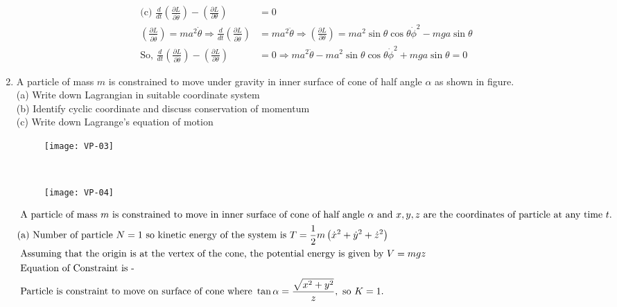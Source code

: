 \begin{enumerate}
\begin{answer}
\begin{align*}
		\text{(c) }\frac{d}{d t}\left(\frac{\partial L}{\partial \dot{\theta}}\right)-\left(\frac{\partial L}{\partial \theta}\right)&=0\\
		\left(\frac{\partial L}{\partial \dot{\theta}}\right)=m a^{2} \dot{\theta} \Rightarrow \frac{d}{d t}\left(\frac{\partial L}{\partial \dot{\theta}}\right)&=m a^{2} \ddot{\theta} \Rightarrow\left(\frac{\partial L}{\partial \theta}\right)=m a^{2} \sin \theta \cos \theta \dot{\phi}^{2}-m g a \sin \theta\\
		\text{So, }\frac{d}{d t}\left(\frac{\partial L}{\partial \dot{\theta}}\right)-\left(\frac{\partial L}{\partial \theta}\right)&=0 \Rightarrow m a^{2} \ddot{\theta}-m a^{2} \sin \theta \cos \theta \dot{\phi}^{2}+m g a \sin \theta=0
		\end{align*}
	\end{answer}
	\item A particle of mass $m$ is constrained to move under gravity in inner surface of cone of half angle $\alpha$ as shown in figure.\\
		(a) Write down Lagrangian in suitable coordinate system\\
		(b) Identify cyclic coordinate and discuss conservation of momentum\\
		(c) Write down Lagrange's equation of motion\\
		\begin{figure}[H]
			\centering
			\texttt{[image: VP-03]}
		\end{figure}
	\begin{answer}$\left. \right. $\\
		\begin{figure}[H]
			\centering
			\texttt{[image: VP-04]}
		\end{figure}
		\begin{align*}
		\intertext{ A particle of mass $m$ is constrained to move in inner surface of cone of half angle $\alpha$ and $x, y, z$ are the coordinates of particle at any time $t$.}
		&\text{(a) Number of particle $N=1$ so kinetic energy of the system is } T=\frac{1}{2} m\left(\dot{x}^{2}+\dot{y}^{2}+\dot{z}^{2}\right)\\
		&\text{	Assuming that the origin is at the vertex of the cone, the potential energy is given by $V=m g z$}\\
		&\text{ Equation of Constraint is -}\\
		&\text{	Particle is constraint to move on surface of cone where }\tan \alpha=\frac{\sqrt{x^{2}+y^{2}}}{z},\text{ so }K=1.\\

\end{align*}
\end{answer}
\end{enumerate}
